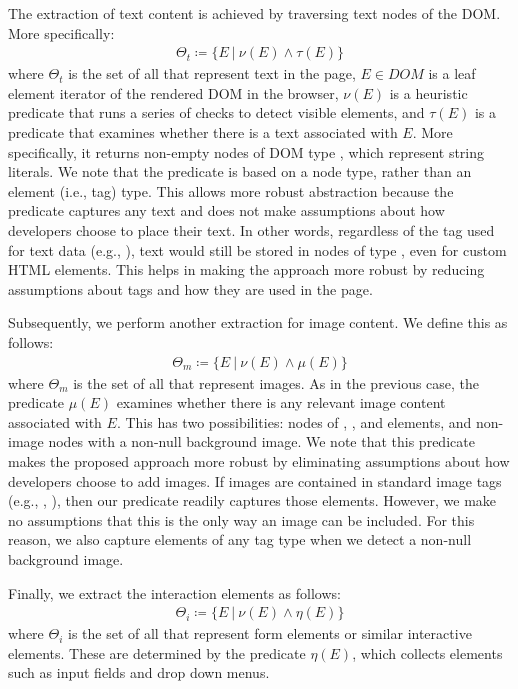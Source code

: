 The extraction of text content is achieved by 
traversing text nodes of the DOM. More specifically:
\begin{align}
    \Theta_{t} \coloneqq \{ E \:\vert\: \nu(E) \land \tau(E) \}
\end{align}
where $\Theta_{t}$ is the set of all {\vizobjs} that represent text in the page,
$E \in DOM$ is a leaf element iterator of the rendered DOM in the browser,
$\nu(E)$ is a heuristic predicate that runs a series of checks
to detect visible elements,
and $\tau(E)$ is a predicate that examines whether
there is a text associated with $E$. 
More specifically, it returns
non-empty nodes of DOM type ,
which represent string literals. 
We note that the predicate is based on a node type, rather than
an element (i.e., tag) type.
This allows more robust abstraction because the predicate captures any text and does not
make assumptions about how developers choose to place their text.
In other words, regardless of the tag used for text data (e.g., ),
text would still be stored in nodes of type , even for custom HTML elements.
This helps in making the approach more robust by reducing assumptions about
tags and how they are used in the page. 


Subsequently, we perform another extraction for image content.
We define this as follows:
\begin{align}
    \Theta_{m} \coloneqq \{ E \:\vert\: \nu(E) \land \mu(E) \}
\end{align}
where $\Theta_{m}$ is the set of all {\vizobjs} that represent images.
As in the previous case,
the predicate $\mu(E)$ examines whether
there is any relevant image content associated with $E$.
This has two possibilities:
nodes of , , and  elements, 
and non-image nodes with a non-null background image.
We note that this predicate makes the proposed approach more robust
by eliminating assumptions about how developers choose to add images.
If images are contained in standard image tags (e.g., , ),
then our predicate readily captures those elements.
However, we make no assumptions that this is the only way an image can be included.
For this reason, we also capture elements of any tag type when we detect a non-null background image.

Finally, we extract the interaction elements as follows:
\begin{align}
    \Theta_{i} \coloneqq \{ E \:\vert\: \nu(E) \land \eta(E) \}
\end{align}
where $\Theta_{i}$ is the set of all {\vizobjs} that represent form elements or similar interactive elements.
These are determined by the predicate $\eta(E)$, which collects
elements such as input fields and drop down menus.

